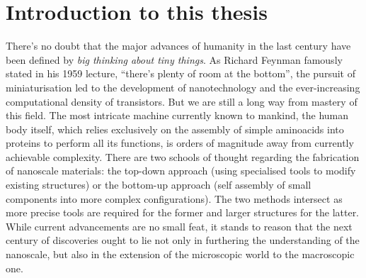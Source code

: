 
\graphicspath{ {\thisch/figures/} }

\chapter*{Introduction to this thesis}\label{intro}

There's no doubt that the major advances of humanity in the last 
century have been defined by \textit{big thinking about tiny things}.
As Richard Feynman famously stated in his 1959 lecture, 
``there's plenty of room at the bottom'', the pursuit
of miniaturisation led to the development of nanotechnology and
the ever-increasing computational density of transistors. But we are
still a long way from mastery of this field.
The most intricate machine currently known to mankind, the human body
itself, which relies exclusively on the assembly of simple aminoacids into proteins 
to perform all its functions, is orders of magnitude away
from currently achievable complexity. There are two schools of thought
regarding the fabrication of nanoscale materials:
the top-down approach (using specialised tools to modify existing 
structures) or the bottom-up approach (self assembly of small 
components into more complex configurations).
The two methods intersect as more precise tools are required for the 
former and larger structures for the latter. 
While current advancements are no small feat, it stands to reason
that the next century of discoveries ought to lie not only in
furthering the understanding of the nanoscale, but also in the
extension of the microscopic world to the macroscopic one. 

